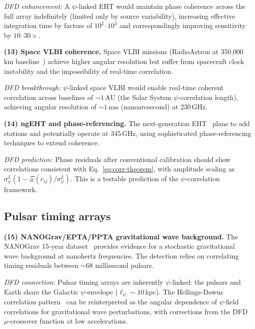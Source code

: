 \documentclass[aps,prl,twocolumn,superscriptaddress,showpacs]{revtex4-2}
\theoremstyle{definition}
\begin{document}
\textit{DFD enhancement:} A $\psi$-linked EHT would maintain
phase coherence across the full array indefinitely (limited only
by source variability), increasing effective integration time
by factors of $10^2$--$10^3$ and correspondingly improving
sensitivity by $10$--$30\times$.

\textbf{(13) Space VLBI coherence.}
Space VLBI missions (RadioAstron at 350,000\,km baseline~\cite{Kardashev2013})
achieve higher angular resolution but suffer from spacecraft
clock instability and the impossibility of real-time correlation.

\textit{DFD breakthrough:} $\psi$-linked space VLBI would enable
real-time coherent correlation across baselines of $\sim 1$\,AU
(the Solar System $\psi$-correlation length), achieving angular
resolution of $\sim 1\,\mathrm{nas}$ (nanoarcsecond) at 230\,GHz.

\textbf{(14) ngEHT and phase-referencing.}
The next-generation EHT~\cite{Doeleman2019,Raymond2024} plans to add stations
and potentially operate at 345\,GHz, using sophisticated
phase-referencing techniques to extend coherence.

\textit{DFD prediction:} Phase residuals after conventional
calibration should show correlations consistent with
Eq.~\eqref{eq:corr-theorem}, with amplitude scaling as
$\sigma_\psi^2(1 - \Xi(r_{ij})/\sigma_\psi^2)$. This is a
testable prediction of the $\psi$-correlation framework.

\subsection{Pulsar timing arrays}

\textbf{(15) NANOGrav/EPTA/PPTA gravitational wave background.}
The NANOGrav 15-year dataset~\cite{NANOGrav2023} provides evidence
for a stochastic gravitational wave background at nanohertz
frequencies. The detection relies on correlating timing residuals
between $\sim 68$ millisecond pulsars.

\textit{DFD connection:} Pulsar timing arrays are inherently
$\psi$-linked: the pulsars and Earth share the Galactic
$\psi$-envelope ($\ell_\psi \sim 10$\,kpc). The Hellings-Downs
correlation pattern~\cite{Hellings1983} can be reinterpreted as
the angular dependence of $\psi$-field correlations for
gravitational wave perturbations, with corrections from the
DFD $\mu$-crossover function at low accelerations.

\end{document}
